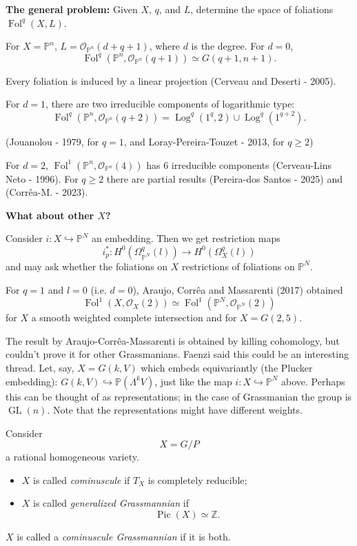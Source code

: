 \medskip\noindent
{\bf The general problem:}
Given $X$, $q$, and $L$, determine the
space of foliations
$\operatorname{Fol}^q(X,L)$.

For $X=\mathbb{P}^n$,
$L=\mathcal{O}_{\mathbb{P}^n}(d+q+1)$,
where $d$ is the degree.
For $d=0$,
$$
\operatorname{Fol}^q
(\mathbb{P}^n,
\mathcal{O}_{\mathbb{P}^n}(q+1))
\simeq G(q+1,n+1).
$$

Every foliation is induced by a linear
projection
(Cerveau and Deserti - 2005).

For $d=1$, there are two irreducible
components of logarithmic type:
$$
\operatorname{Fol}^q
(\mathbb{P}^n,
\mathcal{O}_{\mathbb{P}^n}(q+2))
=
\operatorname{Log}^q(1^q,2)
\cup
\operatorname{Log}^q(1^{q+2}).
$$

(Jouanolou - 1979, for $q=1$, and
Loray-Pereira-Touzet - 2013, for
$q\geq 2$)

For $d=2$,
$\operatorname{Fol}^1
(\mathbb{P}^n,
\mathcal{O}_{\mathbb{P}^n}(4))$
has 6 irreducible components
(Cerveau-Lins Neto - 1996).
For $q\geq 2$ there are partial results
(Pereira-dos Santos - 2025) and
(Corrêa-M. - 2023).

\medskip\noindent
{\bf What about other $X$?}

Consider
$i\colon X\hookrightarrow\mathbb{P}^N$
an embedding.
Then we get restriction maps
$$
i_p^*\colon
H^0(\Omega_{\mathbb{P}^N}^q(l))
\longrightarrow
H^0(\Omega_X^q(l))
$$
and may ask whether the foliations on $X$
restrictions of foliations on
$\mathbb{P}^N$.

For $q=1$ and $l=0$ (i.e. $d=0$),
Araujo, Corrêa and Massarenti (2017)
obtained
$$
\operatorname{Fol}^1
(X,\mathcal{O}_X(2))
\simeq
\operatorname{Fol}^1
(\mathbb{P}^N,
\mathcal{O}_{\mathbb{P}^N}(2))
$$
for $X$ a smooth weighted complete
intersection and for $X=G(2,5)$.

\medskip\noindent
The result by Araujo-Corrêa-Massarenti is
obtained by killing cohomology, but
couldn't prove it for other Grassmanians.
Faenzi said this could be an interesting
thread.
Let, say, $X=G(k,V)$ 
which embeds equivariantly (the
Plucker embedding): $G(k,V)\hookrightarrow
\mathbb{P}(\Lambda^kV)$,
just like the map $i:X \hookrightarrow
\mathbb{P}^N$ above.
Perhaps this can be thought of as
representations; in the case of 
Grassmanian the group is
$\operatorname{GL}(n)$. Note that
the representations might have different
weights.




\begin{definition}
\label{definition-cominuscule-grassmannian}
Consider
$$
X=G/P
$$
a rational homogeneous variety.
\begin{itemize}
\item $X$ is called {\it cominuscule} if
$T_X$ is completely reducible;

\item $X$ is called
{\it generalized Grassmannian} if
$$
\operatorname{Pic}(X)\simeq\mathbb{Z}.
$$
\end{itemize}

$X$ is called a
{\it cominuscule Grassmannian} if it is
both.
\end{definition}


